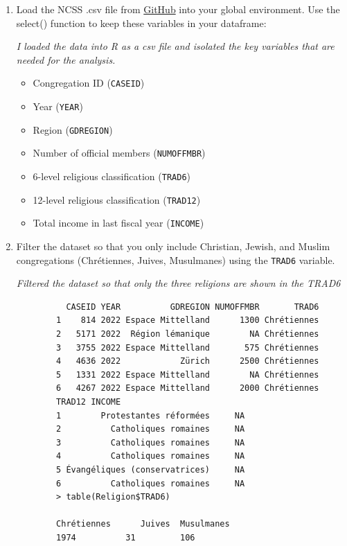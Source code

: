 \documentclass[12pt,letterpaper]{article}
\begin{document}
\begin{enumerate}
\item Load the NCSS .csv file from \href{https://raw.githubusercontent.com/ASDS-TCD/DataViz_2026/refs/heads/main/datasets/NCSS_v1.csv}{GitHub} into your global environment. Use the select() function to keep these variables in your dataframe:

 

	\textit {I loaded the data into R as a csv file and isolated the key variables that are needed for the analysis.}
\begin{itemize}
	\item Congregation ID (\texttt{CASEID})
	\item Year (\texttt{YEAR})
	\item Region (\texttt{GDREGION})
	\item Number of official members (\texttt{NUMOFFMBR})
	\item 6-level religious classification (\texttt{TRAD6})
	\item 12-level religious classification (\texttt{TRAD12})
	\item Total income in last fiscal year (\texttt{INCOME})
\end{itemize}
\item Filter the dataset so that you only include Christian, Jewish, and Muslim congregations (Chrétiennes, Juives, Musulmanes) using the \texttt{TRAD6} variable.
 

	\textit {Filtered the dataset so that only the three religions are shown in the TRAD6 }
	\begin{verbatim}
		  CASEID YEAR          GDREGION NUMOFFMBR       TRAD6
		1    814 2022 Espace Mittelland      1300 Chrétiennes
		2   5171 2022  Région lémanique        NA Chrétiennes
		3   3755 2022 Espace Mittelland       575 Chrétiennes
		4   4636 2022            Zürich      2500 Chrétiennes
		5   1331 2022 Espace Mittelland        NA Chrétiennes
		6   4267 2022 Espace Mittelland      2000 Chrétiennes
		TRAD12 INCOME
		1        Protestantes réformées     NA
		2          Catholiques romaines     NA
		3          Catholiques romaines     NA
		4          Catholiques romaines     NA
		5 Évangéliques (conservatrices)     NA
		6          Catholiques romaines     NA
		> table(Religion$TRAD6)
		
		Chrétiennes      Juives  Musulmanes 
		1974          31         106
	\end{verbatim}
	

\end{enumerate}
\end{document}
